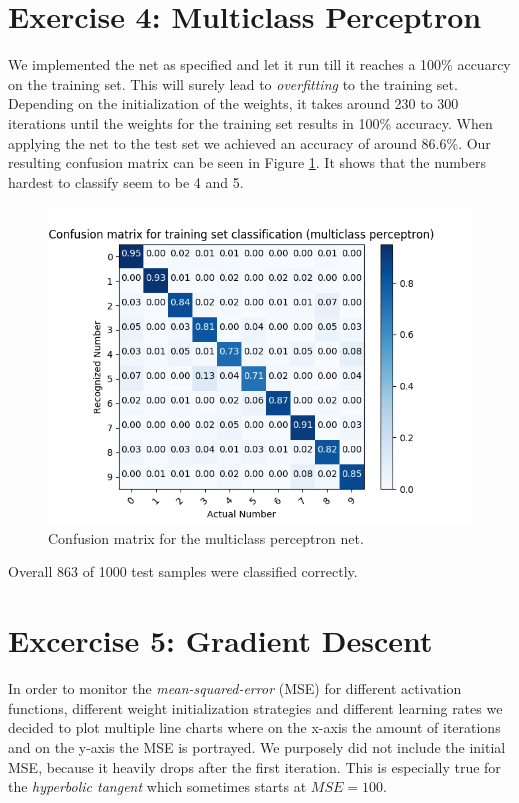 \documentclass{article}
\begin{document}
\section{Exercise 4: Multiclass Perceptron}
We implemented the net as specified and let it run till it reaches a 100\% accuarcy on the training set.
This will surely lead to \emph{overfitting} to the training set.
Depending on the initialization of the weights, it takes around 230 to 300 iterations until the weights for the training set results in 100\% accuracy.
When applying the net to the test set we achieved an accuracy of around 86.6\%.
Our resulting confusion matrix can be seen in Figure \ref{fig:cmperceptron}. It shows that the numbers hardest to classify seem to be 4 and 5.
\begin{figure}[H]
\centering
\includegraphics[width=0.9\linewidth]{img/4/cm_multi_class_perceptron.png}
\caption{Confusion matrix for the multiclass perceptron net.}
\label{fig:cmperceptron}
\end{figure}

Overall 863 of 1000 test samples were classified correctly.


\section{Excercise 5: Gradient Descent}
In order to monitor the \emph{mean-squared-error} (MSE) for different activation functions, different weight initialization strategies and different learning rates we decided to plot multiple line charts where on the x-axis the amount of iterations and on the y-axis the MSE is portrayed.
We purposely did not include the initial MSE, because it heavily drops after the first iteration.
This is especially true for the \emph{hyperbolic tangent} which sometimes starts at $MSE=100$.
\end{document}
